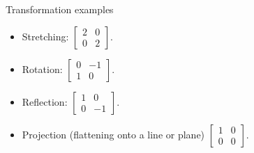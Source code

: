 \documentclass{beamer}
\begin{document}
\begin{frame}{Transformation examples}
  \begin{itemize}
    \item Stretching: 
    $\begin{bmatrix} 2 & 0 \\ 0 & 2 \end{bmatrix}.$ %
    \item Rotation:
    $\begin{bmatrix} 0 & -1 \\ 1 & 0 \end{bmatrix}.$
    \item Reflection:
    $\begin{bmatrix} 1 & 0 \\ 0 & -1 \end{bmatrix}.$
    \item Projection (flattening onto a line or plane) $\begin{bmatrix} 1 & 0 \\ 0 & 0 \end{bmatrix}.$
  \end{itemize}
\end{frame}
\end{document}

